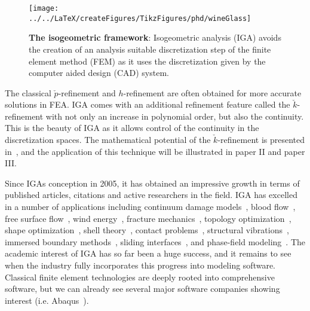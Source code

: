 \begin{figure}
	\centering    
	\texttt{[image: ../../LaTeX/createFigures/TikzFigures/phd/wineGlass]}
	\caption{\textbf{The isogeometric framework}: Isogeometric analysis (IGA) avoids the creation of an analysis suitable discretization step of the finite element method (FEM) as it uses the discretization given by the computer aided design (CAD) system.}
	\label{Fig:wineGlass}
\end{figure}

The classical $\check{p}$-refinement and $h$-refinement are often obtained for more accurate solutions in FEA. IGA comes with an additional refinement feature called the $\check{k}$-refinement with not only an increase in polynomial order, but also the continuity. This is the beauty of IGA as it allows control of the continuity in the discretization spaces. The mathematical potential of the $\check{k}$-refinement is presented in~\cite{BeiraodaVeiga2011sef}, and the application of this technique will be illustrated in paper II and paper III.

Since IGAs conception in 2005, it has obtained an impressive growth in terms of published articles, citations and active researchers in the field. IGA has excelled in a number of applications including continuum damage models~\cite{Verhoosel2011aia}, blood flow~\cite{Bazilevs2006ifi,Zhang2007psv,Morganti2015psi}, free surface flow~\cite{Akkerman2011iao}, wind energy~\cite{Hsu2011hpc,Bazilevs2012ifi}, fracture mechanics~\cite{Borden2012apf,Borden2014aho,Moutsanidis2018hpf}, topology optimization~\cite{Dede2012iaf}, shape optimization~\cite{Manh2011iso,Kiendl2014iso}, shell theory~\cite{Benson2010isa}, contact problems~\cite{Dittmann2014iaa,Temizer2011cti}, structural vibrations~\cite{Cottrell2006iao}, immersed boundary methods~\cite{Schillinger2012aid}, sliding interfaces~\cite{Bazilevs2008nbi}, and phase-field modeling~\cite{Gomez2008iao}. The academic interest of IGA has so far been a huge success, and it remains to see when the industry fully incorporates this progress into modeling software. Classical finite element technologies are deeply rooted into comprehensive software, but we can already see several major software companies showing interest (i.e. Abaqus~\cite{Lai2017icw}).	


